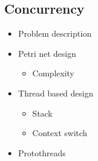 \subsection{Concurrency}
\begin{itemize}
\item Problem description
\item Petri net design
\begin{itemize}
\item Complexity
\end{itemize}
\item Thread based design
\begin{itemize}
\item Stack
\item Context switch
\end{itemize}
\item Protothreads
\end{itemize}
